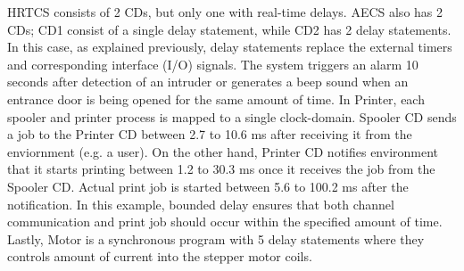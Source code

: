 
HRTCS consists of 2 CDs, but only one with real-time delays. AECS also
has 2 CDs; CD1 consist of a single delay statement, while CD2 has 2
delay statements. In this case, as explained previously, delay
statements replace the external timers and corresponding interface (I/O)
signals. The system triggers an alarm 10 seconds after detection of an
intruder or generates a beep sound when an entrance door is being opened
for the same amount of time. In Printer, each spooler and printer
process is mapped to a single clock-domain. Spooler CD sends a job to
the Printer CD between 2.7 to 10.6 ms after receiving it from the
enviornment (e.g. a user). On the other hand, Printer CD notifies
environment that it starts printing between 1.2 to 30.3 ms once it
receives the job from the Spooler CD. Actual print job is started
between 5.6 to 100.2 ms after the notification. In this example, bounded
delay ensures that both channel communication and print job should occur
within the specified amount of time. Lastly, Motor is a synchronous
program with 5 delay statements where they controls amount of current
into the stepper motor coils. 





